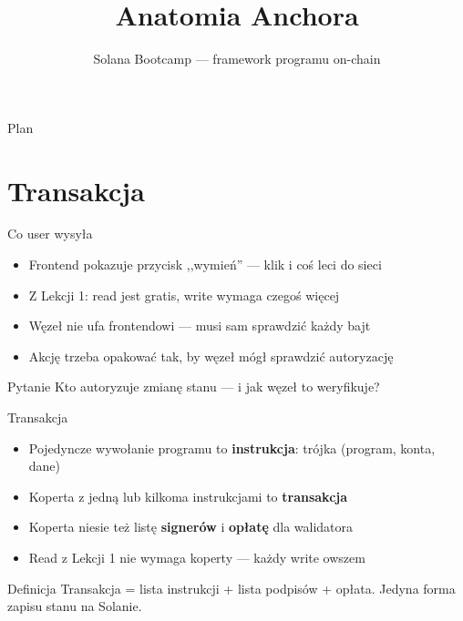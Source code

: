 

\usepackage[utf8]{inputenc}
\usepackage[T1]{fontenc}

\title{Anatomia Anchora}
\subtitle{Solana Bootcamp --- framework programu on-chain}
\author{}



\maketitleframe

\begin{frame}{Plan}
  \tableofcontents
\end{frame}

\section{Transakcja}

\begin{frame}{Co user wysyła}
  \begin{itemize}
    \item Frontend pokazuje przycisk ,,wymień'' --- klik i coś leci do sieci
    \item Z Lekcji 1: read jest gratis, write wymaga czegoś więcej
    \item Węzeł nie ufa frontendowi --- musi sam sprawdzić każdy bajt
    \item Akcję trzeba opakować tak, by węzeł mógł sprawdzić autoryzację
  \end{itemize}
  \vspace{0.25cm}
  \begin{alertblock}{Pytanie}
    Kto autoryzuje zmianę stanu --- i jak węzeł to weryfikuje?
  \end{alertblock}
\end{frame}

\begin{frame}{Transakcja}
  \begin{itemize}
    \item Pojedyncze wywołanie programu to \textbf{instrukcja}: trójka (program, konta, dane)
    \item Koperta z jedną lub kilkoma instrukcjami to \textbf{transakcja}
    \item Koperta niesie też listę \textbf{signerów} i \textbf{opłatę} dla walidatora
    \item Read z Lekcji 1 nie wymaga koperty --- każdy write owszem
  \end{itemize}
  \vspace{0.25cm}
  \begin{block}{Definicja}
    Transakcja = lista instrukcji + lista podpisów + opłata.
    Jedyna forma zapisu stanu na Solanie.
  \end{block}
\end{frame}

